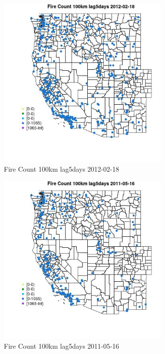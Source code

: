 \begin{figure} 
\centering  
\includegraphics[width=0.77\textwidth]{Code_Outputs/Report_ML_input_PM25_Step4_part_f_de_duplicated_aveswNAs_MapObsFire_Count_100km_lag5days2012-02-18.jpg} 
\caption{\label{fig:Report_ML_input_PM25_Step4_part_f_de_duplicated_aveswNAsMapObsFire_Count_100km_lag5days2012-02-18}Fire Count 100km lag5days 2012-02-18} 
\end{figure} 
 

\begin{figure} 
\centering  
\includegraphics[width=0.77\textwidth]{Code_Outputs/Report_ML_input_PM25_Step4_part_f_de_duplicated_aveswNAs_MapObsFire_Count_100km_lag5days2011-05-16.jpg} 
\caption{\label{fig:Report_ML_input_PM25_Step4_part_f_de_duplicated_aveswNAsMapObsFire_Count_100km_lag5days2011-05-16}Fire Count 100km lag5days 2011-05-16} 
\end{figure} 
 

